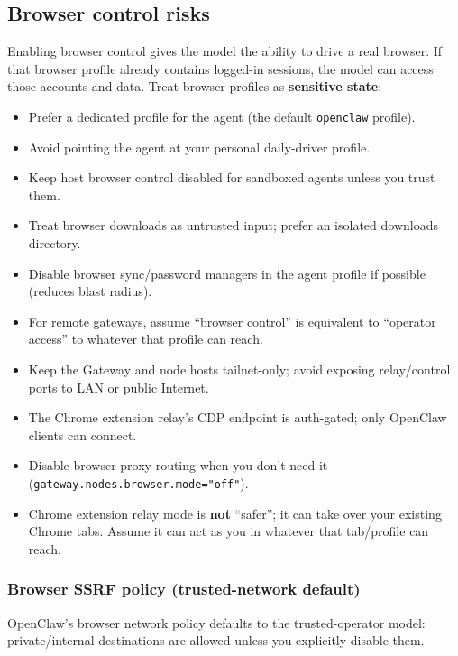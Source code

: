 \subsection{Browser control risks}


Enabling browser control gives the model the ability to drive a real browser.
If that browser profile already contains logged-in sessions, the model can
access those accounts and data. Treat browser profiles as \textbf{sensitive state}:

\begin{itemize}
  \item Prefer a dedicated profile for the agent (the default \texttt{openclaw} profile).
  \item Avoid pointing the agent at your personal daily-driver profile.
  \item Keep host browser control disabled for sandboxed agents unless you trust them.
  \item Treat browser downloads as untrusted input; prefer an isolated downloads directory.
  \item Disable browser sync/password managers in the agent profile if possible (reduces blast radius).
  \item For remote gateways, assume “browser control” is equivalent to “operator access” to whatever that profile can reach.
  \item Keep the Gateway and node hosts tailnet-only; avoid exposing relay/control ports to LAN or public Internet.
  \item The Chrome extension relay’s CDP endpoint is auth-gated; only OpenClaw clients can connect.
  \item Disable browser proxy routing when you don’t need it (\texttt{gateway.nodes.browser.mode="off"}).
  \item Chrome extension relay mode is \textbf{not} “safer”; it can take over your existing Chrome tabs. Assume it can act as you in whatever that tab/profile can reach.
\end{itemize}


\subsubsection{Browser SSRF policy (trusted-network default)}


OpenClaw’s browser network policy defaults to the trusted-operator model: private/internal destinations are allowed unless you explicitly disable them.

